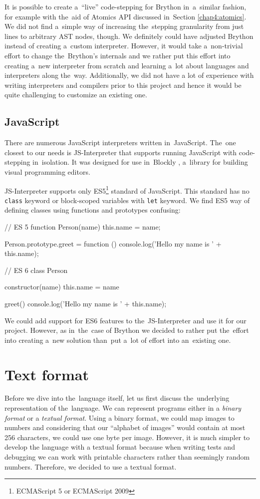 It is possible to create a~``live'' code-stepping for Brython in~a~similar fashion, for example with the~aid of Atomics API discussed in~Section \ref{chap4:atomics}.
We did not find a~simple way of increasing the~stepping granularity from just lines to arbitrary AST nodes, though. We definitely could have adjusted Brython instead
of creating a~custom interpreter. However, it would take a~non-trivial effort to change the~Brython's internals and we rather put this effort into creating
a~new interpreter from scratch and learning a~lot about languages and interpreters along the~way. Additionally, we did not have a lot of experience with writing
interpreters and compilers prior to this project and hence it would be quite challenging to customize an existing one.

\subsection{JavaScript}
\label{chap3:javascript}
There are numerous JavaScript interpreters written in~JavaScript. The~one closest to our needs is JS-Interpreter \cite{JSInterpreter} that supports running JavaScript
with code-stepping in~isolation. It was designed for use in~Blockly \cite{Blockly}, a~library for building visual programming editors.

JS-Interpreter supports only ES5\footnote{ECMAScript 5 or ECMAScript 2009} standard of JavaScript. This standard has no \texttt{class} keyword or block-scoped
variables with \texttt{let} keyword. We find ES5 way of defining classes using functions and prototypes confusing:
\begin{code}
// ES 5
function Person(name) {
    this.name = name;  
}

Person.prototype.greet = function () {
    console.log('Hello my name is ' + this.name);
}

// ES 6
class Person {
    constructor(name) {
        this.name = name
    }

    greet() {
        console.log('Hello my name is ' + this.name);
    }
}
\end{code}

We could add support for ES6 features to the~JS-Interpreter and use it for our project. However, as in~the~case of Brython we decided to rather put the~effort into
creating a~new solution than~put a~lot of effort into an~existing one.

\section{Text format}
Before we dive into the~language itself, let us first discuss the~underlying representation of the~language. We can represent programs either
in a \emph{binary format} or a \emph{textual format}. Using a binary format, we could map images to numbers and considering that our ``alphabet of images''
would contain at most 256 characters, we could use one byte per image. However, it is much simpler to develop the language with a textual format because
when writing tests and debugging we can work with printable characters rather than seemingly random numbers. Therefore, we decided to use a textual format.

